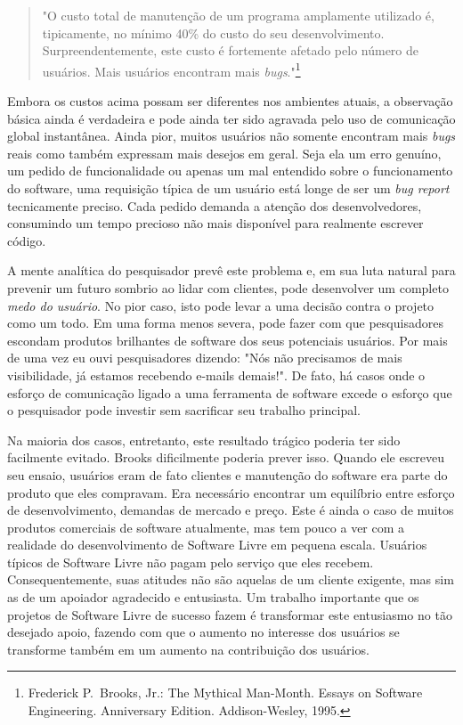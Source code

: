 %
\begin{quote}
"O custo total de manutenção de um programa amplamente utilizado é, tipicamente,
no mínimo 40\% do custo do seu desenvolvimento. Surpreendentemente, este custo é
fortemente afetado pelo número de usuários. Mais usuários encontram mais \textit{bugs}."\footnote{
Frederick P.\ Brooks, Jr.: The Mythical Man-Month. Essays on Software Engineering. Anniversary
Edition. Addison-Wesley, 1995.}
\end{quote}
%
Embora os custos acima possam ser diferentes nos ambientes atuais, a observação básica
ainda é verdadeira e pode ainda ter sido agravada pelo uso de comunicação global
instantânea. Ainda pior, muitos usuários não somente encontram mais \textit{bugs} reais
como também expressam mais desejos em geral. Seja ela um erro genuíno, um pedido de
funcionalidade ou apenas um mal entendido sobre o funcionamento do software, uma requisição
típica de um usuário está longe de ser um \textit{bug report} tecnicamente preciso. Cada
pedido demanda a atenção dos desenvolvedores, consumindo um tempo precioso não mais disponível
para realmente escrever código.

A mente analítica do pesquisador prevê este problema e, em sua luta natural para prevenir
um futuro sombrio ao lidar com clientes, pode desenvolver um completo \textit{medo do usuário}.
No pior caso, isto pode levar a uma decisão contra o projeto como um todo. Em uma forma
menos severa, pode fazer com que pesquisadores escondam produtos brilhantes de software
dos seus potenciais usuários. Por mais de uma vez eu ouvi pesquisadores dizendo: "Nós não
precisamos de mais visibilidade, já estamos recebendo e-mails demais!". De fato, há casos
onde o esforço de comunicação ligado a uma ferramenta de software excede o esforço que o
pesquisador pode investir sem sacrificar seu trabalho principal.

Na maioria dos casos, entretanto, este resultado trágico poderia ter sido facilmente evitado.
Brooks dificilmente poderia prever isso. Quando ele escreveu seu ensaio, usuários eram de fato
clientes e manutenção do software era parte do produto que eles compravam. Era necessário
encontrar um equilíbrio entre esforço de desenvolvimento, demandas de mercado e preço.
Este é ainda o caso de muitos produtos comerciais de software atualmente, mas tem pouco a
ver com a realidade do desenvolvimento de Software Livre em pequena escala. Usuários típicos de
Software Livre não pagam pelo serviço que eles recebem. Consequentemente, suas atitudes não
são aquelas de um cliente exigente, mas sim as de um apoiador agradecido e entusiasta.
Um trabalho importante que os projetos de Software Livre de sucesso fazem é transformar
este entusiasmo no tão desejado apoio, fazendo com que o aumento no interesse dos usuários
se transforme também em um aumento na contribuição dos usuários.

